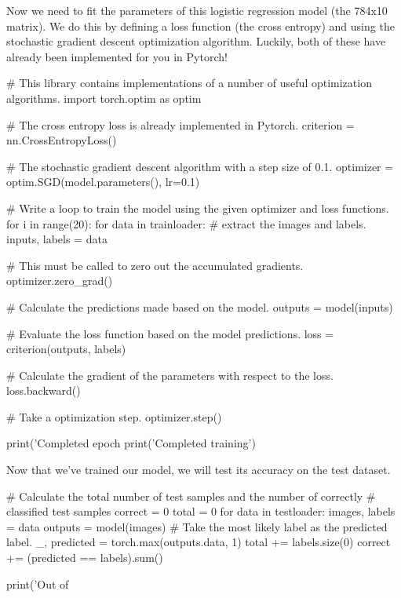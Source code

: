 Now we need to fit the parameters of this logistic regression model (the 784x10 matrix). We do this by defining a loss function (the cross entropy) and using the stochastic gradient descent optimization algorithm. Luckily, both of these have already been implemented for you in Pytorch!
\begin{python}
# This library contains implementations of a number of useful optimization algorithms.
import torch.optim as optim

# The cross entropy loss is already implemented in Pytorch.
criterion = nn.CrossEntropyLoss()

# The stochastic gradient descent algorithm with a step size of 0.1.
optimizer = optim.SGD(model.parameters(), lr=0.1)

# Write a loop to train the model using the given optimizer and loss functions.
for i in range(20):
  for data in trainloader:
    # extract the images and labels.
    inputs, labels = data
    
    # This must be called to zero out the accumulated gradients.
    optimizer.zero_grad()
    
    # Calculate the predictions made based on the model.
    outputs = model(inputs)
    
    # Evaluate the loss function based on the model predictions.
    loss = criterion(outputs, labels)
    
    # Calculate the gradient of the parameters with respect to the loss.
    loss.backward()
    
    # Take a optimization step.
    optimizer.step()
    
  print('Completed epoch %
print('Completed training')
\end{python}
Now that we've trained our model, we will test its accuracy on the test dataset.
\begin{python}
# Calculate the total number of test samples and the number of correctly 
# classified test samples
correct = 0
total = 0
for data in testloader:
  images, labels = data
  outputs = model(images)
  # Take the most likely label as the predicted label.
  _, predicted = torch.max(outputs.data, 1)
  total += labels.size(0)
  correct += (predicted == labels).sum()

print('Out of %
\end{python}

